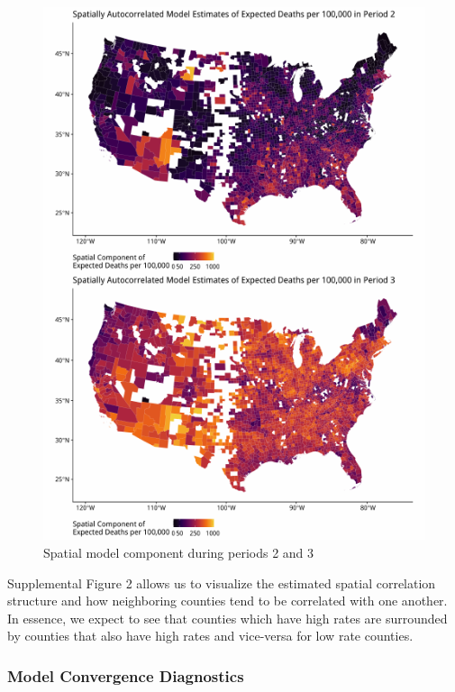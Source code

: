 \documentclass[
]{article}
\begin{document}
\begin{figure}

{\centering \includegraphics[width=0.8\linewidth,height=0.6\textheight]{supplement_files/figure-latex/unnamed-chunk-2-1} 

}

\caption{Spatial model component during periods 2 and 3}\label{fig:unnamed-chunk-2}
\end{figure}

Supplemental Figure 2 allows us to visualize the estimated spatial
correlation structure and how neighboring counties tend to be correlated
with one another. In essence, we expect to see that counties which have
high rates are surrounded by counties that also have high rates and
vice-versa for low rate counties.

\newpage

\hypertarget{model-convergence-diagnostics}{%
\subsubsection{Model Convergence
Diagnostics}\label{model-convergence-diagnostics}}
\end{document}
